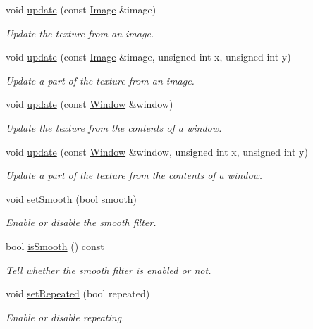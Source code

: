 \begin{DoxyCompactItemize}
void \hyperlink{classsf_1_1Texture_a037cdf171af0fb392d07626a44a4ea17}{update} (const \hyperlink{classsf_1_1Image}{Image} \&image)
\begin{DoxyCompactList}\small\item\em Update the texture from an image. \end{DoxyCompactList}\item 
void \hyperlink{classsf_1_1Texture_a87f916490b757fe900798eedf3abf3ba}{update} (const \hyperlink{classsf_1_1Image}{Image} \&image, unsigned int x, unsigned int y)
\begin{DoxyCompactList}\small\item\em Update a part of the texture from an image. \end{DoxyCompactList}\item 
void \hyperlink{classsf_1_1Texture_ad3cceef238f7d5d2108a98dd38c17fc5}{update} (const \hyperlink{classsf_1_1Window}{Window} \&window)
\begin{DoxyCompactList}\small\item\em Update the texture from the contents of a window. \end{DoxyCompactList}\item 
void \hyperlink{classsf_1_1Texture_a154f246eb8059b602076009ab1cfd175}{update} (const \hyperlink{classsf_1_1Window}{Window} \&window, unsigned int x, unsigned int y)
\begin{DoxyCompactList}\small\item\em Update a part of the texture from the contents of a window. \end{DoxyCompactList}\item 
void \hyperlink{classsf_1_1Texture_a0c3bd6825b9a99714f10d44179d74324}{set\+Smooth} (bool smooth)
\begin{DoxyCompactList}\small\item\em Enable or disable the smooth filter. \end{DoxyCompactList}\item 
bool \hyperlink{classsf_1_1Texture_a3ebb050b5a71e1d40ba66eb1a060e103}{is\+Smooth} () const
\begin{DoxyCompactList}\small\item\em Tell whether the smooth filter is enabled or not. \end{DoxyCompactList}\item 
void \hyperlink{classsf_1_1Texture_aaa87d1eff053b9d4d34a24c784a28658}{set\+Repeated} (bool repeated)
\begin{DoxyCompactList}\small\item\em Enable or disable repeating. \end{DoxyCompactList}\item 

\end{DoxyCompactItemize}
